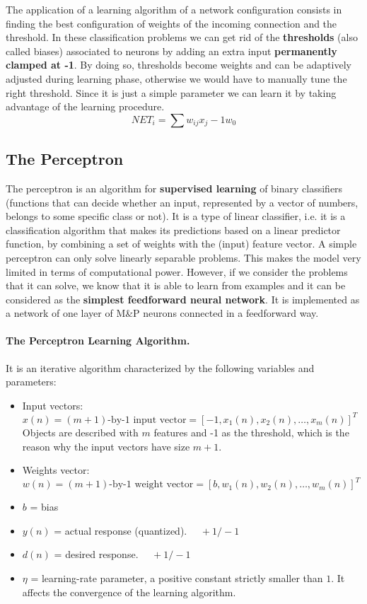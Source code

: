 The application of a learning algorithm of a network configuration consists in finding the best configuration of weights of the incoming connection and the threshold.
In these classification problems we can get rid of the \textbf{thresholds} (also called biases) associated to neurons by adding an extra input \textbf{permanently clamped at -1}. By doing so, thresholds become weights and can be adaptively adjusted during learning phase, otherwise we would have to manually tune the right threshold. Since it is just a simple parameter we can learn it by taking advantage of the learning procedure. 
$$NET_i = \sum w_{ij} x_j -1w_0$$

\subsection{The Perceptron}
The perceptron is an algorithm for \textbf{supervised learning} of binary classifiers (functions that can decide whether an input, represented by a vector of numbers, belongs to some specific class or not). It is a type of linear classifier, i.e. it is a classification algorithm that makes its predictions based on a linear predictor function, by combining a set of weights with the (input) feature vector. A simple perceptron can only solve linearly separable problems. This makes the model very limited in terms of computational power. However, if we consider the problems that it can solve, we know that it is able to learn from examples and it can be considered as the \textbf{simplest feedforward neural network}. It is implemented as a network of one layer of M\&P neurons connected in a feedforward way.

\paragraph*{The Perceptron Learning Algorithm.} It is an iterative algorithm characterized by the following variables and parameters:
\begin{itemize}
	\item Input vectors: $x(n) = (m+1)\text{-by-1 input vector} = [-1, x_1(n), x_2(n), \dots, x_m(n)]^T$\\
	Objects are described with $m$ features and -1 as the threshold, which is the reason why the input vectors have size $m+1$.
	\item Weights vector: $w(n) = (m+1)\text{-by-1 weight vector} = [b, w_1(n), w_2(n), \dots, w_m(n)]^T$
	\item $b$ = bias
	\item $y(n)$ = actual response (quantized). $\quad +1/-1$
	\item $d(n)$ = desired response. $\quad +1/-1$
	\item $\eta$ = learning-rate parameter, a positive constant strictly smaller than $1$. It affects the convergence of the learning algorithm. 
\end{itemize}

